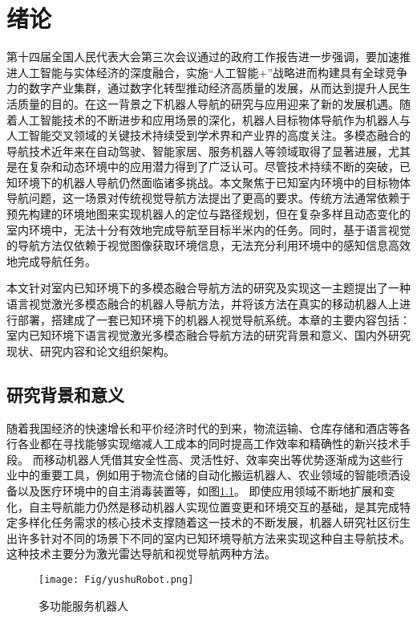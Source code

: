\chapter{绪论}
%
	第十四届全国人民代表大会第三次会议通过的政府工作报告进一步强调，要加速推进人工智能与实体经济的深度融合，实施“人工智能+”战略进而构建具有全球竞争力的数字产业集群，通过数字化转型推动经济高质量的发展，从而达到提升人民生活质量\cite{China2025}的目的。在这一背景之下机器人导航的研究与应用迎来了新的发展机遇。随着人工智能技术的不断进步和应用场景的深化，机器人目标物体导航\cite{zhang2022survey}作为机器人与人工智能交叉领域的关键技术持续受到学术界和产业界的高度关注。多模态融合的导航技术近年来在自动驾驶、智能家居、服务机器人等领域取得了显著进展\cite{majumdar2022zson}，尤其是在复杂和动态环境中的应用潜力得到了广泛认可。尽管技术持续不断的突破，已知环境下的机器人导航仍然面临诸多挑战。本文聚焦于已知室内环境中的目标物体导航问题\cite{sun2024survey}，这一场景对传统视觉导航方法提出了更高的要求。传统方法通常依赖于预先构建的环境地图来实现机器人的定位与路径规划，但在复杂多样且动态变化的室内环境中，无法十分有效地完成导航至目标半米内的任务\cite{mavrogiannis2023core}。同时，基于语言视觉的导航方法仅依赖于视觉图像获取环境信息，无法充分利用环境中的感知信息高效地完成导航任务\cite{li2023reinforcement}。

	本文针对室内已知环境下的多模态融合导航方法的研究及实现这一主题提出了一种语言视觉激光多模态融合的机器人导航方法，并将该方法在真实的移动机器人上进行部署，搭建成了一套已知环境下的机器人视觉导航系统。本章的主要内容包括：室内已知环境下语言视觉激光多模态融合导航方法的研究背景和意义、国内外研究现状、研究内容和论文组织架构。

\section{研究背景和意义}
	随着我国经济的快速增长和平价经济时代的到来，物流运输、仓库存储和酒店等各行各业都在寻找能够实现缩减人工成本的同时提高工作效率和精确性的新兴技术手段。
	而移动机器人凭借其安全性高、灵活性好、效率突出等优势逐渐成为这些行业中的重要工具\cite{reddy2023advancements}，例如用于物流仓储的自动化搬运机器人、农业领域的智能喷洒设备以及医疗环境中的自主消毒装置等，如图\ref{serverrobot}。
	即使应用领域不断地扩展和变化，自主导航能力仍然是移动机器人实现位置变更和环境交互的基础，是其完成特定多样化任务需求的核心技术支撑随着这一技术的不断发展，机器人研究社区衍生出许多针对不同的场景下不同的室内已知环境导航方法来实现这种自主导航技术。这种技术主要分为激光雷达导航\cite{zhang2014loam}和视觉导航\cite{kazerouni2022survey}两种方法。
	\begin{figure}[htbp]
		\centering
		\texttt{[image: Fig/yushuRobot.png]}
		\caption{\label{serverrobot}多功能服务机器人}
	\end{figure}

